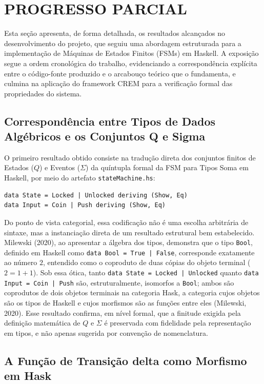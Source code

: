 \documentclass[12pt,a4paper]{article}
\begin{document}
\section{PROGRESSO PARCIAL}

Esta seção apresenta, de forma detalhada, os resultados alcançados no desenvolvimento do projeto, que seguiu uma abordagem estruturada para a implementação de Máquinas de Estados Finitos (FSMs) em Haskell. A exposição segue a ordem cronológica do trabalho, evidenciando a correspondência explícita entre o código-fonte produzido e o arcabouço teórico que o fundamenta, e culmina na aplicação do framework CREM para a verificação formal das propriedades do sistema.

\subsection{Correspondência entre Tipos de Dados Algébricos e os Conjuntos Q e Sigma}

O primeiro resultado obtido consiste na tradução direta dos conjuntos finitos de Estados ($Q$) e Eventos ($\Sigma$) da quíntupla formal da FSM para Tipos Soma em Haskell, por meio do artefato \texttt{stateMachine.hs}:

\begin{verbatim}
data State = Locked | Unlocked deriving (Show, Eq)
data Input = Coin | Push deriving (Show, Eq)
\end{verbatim}

Do ponto de vista categorial, essa codificação não é uma escolha arbitrária de sintaxe, mas a instanciação direta de um resultado estrutural bem estabelecido. Milewski (2020), ao apresentar a álgebra dos tipos, demonstra que o tipo \texttt{Bool}, definido em Haskell como \texttt{data Bool = True | False}, corresponde exatamente ao número $2$, entendido como o coproduto de duas cópias do objeto terminal ($2 = 1 + 1$). Sob essa ótica, tanto \texttt{data State = Locked | Unlocked} quanto \texttt{data Input = Coin | Push} são, estruturalmente, isomorfos a \texttt{Bool}; ambos são coprodutos de dois objetos terminais na categoria Hask, a categoria cujos objetos são os tipos de Haskell e cujos morfismos são as funções entre eles (Milewski, 2020). Esse resultado confirma, em nível formal, que a finitude exigida pela definição matemática de $Q$ e $\Sigma$ é preservada com fidelidade pela representação em tipos, e não apenas sugerida por convenção de nomenclatura.

\subsection{A Função de Transição delta como Morfismo em Hask}
\end{document}

